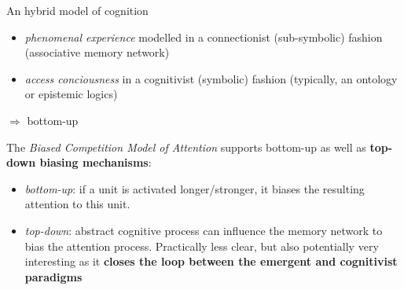 \documentclass[compress]{beamer}
\begin{document}
\begin{frame}{An hybrid model of cognition}

    \begin{itemize}
        \item \emph{phenomenal experience} modelled in a connectionist
            (sub-symbolic) fashion (associative
    memory network)
\item \emph{access conciousness} in a cognitivist (symbolic) fashion (typically,
    an ontology or epistemic logics)

    \end{itemize}

    $\Rightarrow$ bottom-up

    \pause

    The \emph{Biased Competition Model of Attention} supports bottom-up as well
    as {\bf top-down biasing mechanisms}: 
    
    \begin{itemize}
        \item \emph{bottom-up}: if a unit is
            activated longer/stronger, it biases the resulting attention to this
            unit.
        \item \emph{top-down}: abstract cognitive process can influence the memory network
            to bias the attention process. Practically less clear, but also potentially very interesting
            as it {\bf closes the loop between the emergent and cognitivist
            paradigms}

    \end{itemize}

\end{frame}
\end{document}

